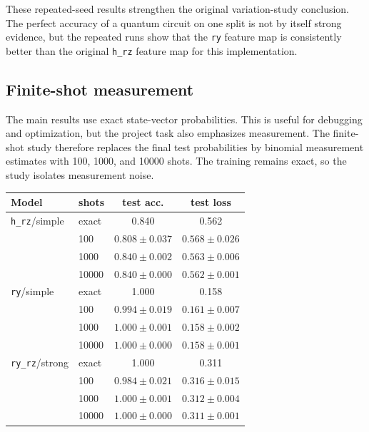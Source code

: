 \documentclass[10pt,a4paper]{article}
\newcommand{\code}[1]{\texttt{#1}}
\begin{document}
These repeated-seed results strengthen the original variation-study conclusion. The perfect accuracy of a quantum circuit on one split is not by itself strong evidence, but the repeated runs show that the \code{ry} feature map is consistently better than the original \code{h\_rz} feature map for this implementation.

\subsection{Finite-shot measurement}
The main results use exact state-vector probabilities. This is useful for debugging and optimization, but the project task also emphasizes measurement. The finite-shot study therefore replaces the final test probabilities by binomial measurement estimates with 100, 1000, and 10000 shots. The training remains exact, so the study isolates measurement noise.

\begin{center}
\label{tab:shot-noise}
\setlength{\tabcolsep}{2pt}
\begin{tabular}{@{}llcc@{}}
\toprule
Model & shots & test acc. & test loss \\
\midrule
\code{h\_rz}/simple & exact & 0.840 & 0.562 \\
 & 100 & \(0.808\pm0.037\) & \(0.568\pm0.026\) \\
 & 1000 & \(0.840\pm0.002\) & \(0.563\pm0.006\) \\
 & 10000 & \(0.840\pm0.000\) & \(0.562\pm0.001\) \\
\code{ry}/simple & exact & 1.000 & 0.158 \\
 & 100 & \(0.994\pm0.019\) & \(0.161\pm0.007\) \\
 & 1000 & \(1.000\pm0.001\) & \(0.158\pm0.002\) \\
 & 10000 & \(1.000\pm0.000\) & \(0.158\pm0.001\) \\
\code{ry\_rz}/strong & exact & 1.000 & 0.311 \\
 & 100 & \(0.984\pm0.021\) & \(0.316\pm0.015\) \\
 & 1000 & \(1.000\pm0.001\) & \(0.312\pm0.004\) \\
 & 10000 & \(1.000\pm0.000\) & \(0.311\pm0.001\) \\
\bottomrule
\end{tabular}
\end{center}
\end{document}

